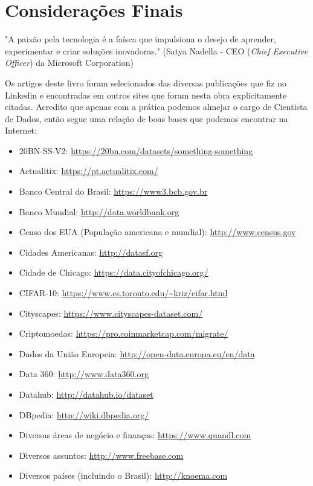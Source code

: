 \documentclass[a4paper,11pt]{book} %
\begin{document}
\chapter{Considerações Finais}
\begin{remark}
"A paixão pela tecnologia é a faísca que impulsiona o desejo de aprender, experimentar e criar soluções inovadoras." (Satya Nadella - CEO (\textit{Chief Executive Officer}) da Microsoft Corporation)
\end{remark}
Os artigos deste livro foram selecionados das diversas publicações que fiz no Linkedin e encontradas em outros sites que foram nesta obra explicitamente citadas. Acredito que apenas com a prática podemos almejar o cargo de Cientista de Dados, então segue uma relação de boas bases que podemos encontrar na Internet:
\begin{itemize}[noitemsep]
	\item 20BN-SS-V2: \url{https://20bn.com/datasets/something-something}
	\item Actualitix: \url{https://pt.actualitix.com/}
	\item Banco Central do Brasil: \url{https://www3.bcb.gov.br}
	\item Banco Mundial: \url{http://data.worldbank.org}
	\item Censo dos EUA (População americana e mundial): \url{http://www.census.gov}
	\item Cidades Americanas: \url{http://datasf.org}
	\item Cidade de Chicago: \url{https://data.cityofchicago.org/}
	\item CIFAR-10: \url{https://www.cs.toronto.edu/~kriz/cifar.html}
	\item Cityscapes: \url{https://www.cityscapes-dataset.com/}
	\item Criptomoedas: \url{https://pro.coinmarketcap.com/migrate/}
	\item Dados da União Europeia: \url{http://open-data.europa.eu/en/data}
	\item Data 360: \url{http://www.data360.org}
	\item Datahub: \url{http://datahub.io/dataset}
	\item DBpedia: \url{http://wiki.dbpedia.org/}
	\item Diversas áreas de negócio e finanças: \url{https://www.quandl.com}
	\item Diversos assuntos: \url{http://www.freebase.com}
	\item Diversos países (incluindo o Brasil): \url{http://knoema.com}

\end{itemize}
\end{document}

